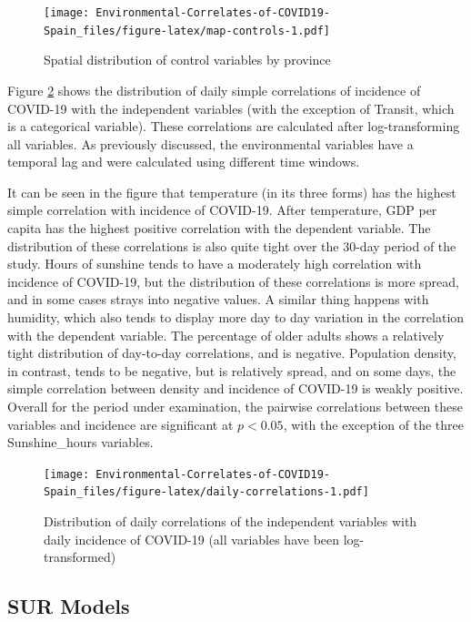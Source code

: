 \documentclass[]{elsarticle} %
\begin{document}
\begin{figure}
\centering
\texttt{[image: Environmental-Correlates-of-COVID19-Spain\_files/figure-latex/map-controls-1.pdf]}
\caption{\label{fig:map-controls}Spatial distribution of control
variables by province}
\end{figure}

Figure \ref{fig:daily-correlations} shows the distribution of daily
simple correlations of incidence of COVID-19 with the independent
variables (with the exception of Transit, which is a categorical
variable). These correlations are calculated after log-transforming all
variables. As previously discussed, the environmental variables have a
temporal lag and were calculated using different time windows.

It can be seen in the figure that temperature (in its three forms) has
the highest simple correlation with incidence of COVID-19. After
temperature, GDP per capita has the highest positive correlation with
the dependent variable. The distribution of these correlations is also
quite tight over the 30-day period of the study. Hours of sunshine tends
to have a moderately high correlation with incidence of COVID-19, but
the distribution of these correlations is more spread, and in some cases
strays into negative values. A similar thing happens with humidity,
which also tends to display more day to day variation in the correlation
with the dependent variable. The percentage of older adults shows a
relatively tight distribution of day-to-day correlations, and is
negative. Population density, in contrast, tends to be negative, but is
relatively spread, and on some days, the simple correlation between
density and incidence of COVID-19 is weakly positive. Overall for the
period under examination, the pairwise correlations between these
variables and incidence are significant at \(p<0.05\), with the
exception of the three Sunshine\_hours variables.

\begin{figure}
\centering
\texttt{[image: Environmental-Correlates-of-COVID19-Spain\_files/figure-latex/daily-correlations-1.pdf]}
\caption{\label{fig:daily-correlations}Distribution of daily
correlations of the independent variables with daily incidence of
COVID-19 (all variables have been log-transformed)}
\end{figure}

\hypertarget{sur-models}{%
\subsection{SUR Models}\label{sur-models}}
\end{document}
